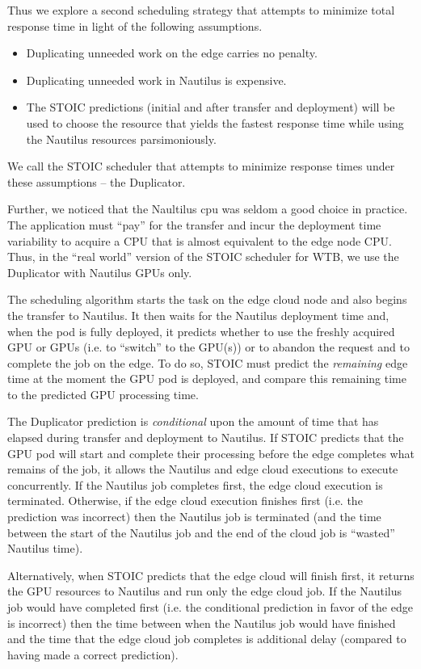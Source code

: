 Thus we explore a second scheduling strategy that attempts to minimize total response time in light of the following assumptions.
\begin{itemize}
\item Duplicating unneeded work on the edge carries no penalty.
\item Duplicating unneeded work in Nautilus is expensive.
\item The STOIC predictions (initial and after transfer and deployment) will be used to
choose the resource that yields the fastest response time while using the
Nautilus resources parsimoniously.
\end{itemize}
We call the STOIC scheduler that attempts to minimize response times under these assumptions -- the Duplicator.

Further, we noticed that the Naultilus cpu was seldom a good choice in practice. The application must ``pay'' for the transfer and incur the deployment time variability to acquire a CPU that is almost equivalent to the edge node CPU.  Thus, in the ``real world'' version of the STOIC scheduler for WTB, we use the Duplicator with Nautilus GPUs only.

The scheduling algorithm starts the task on the edge cloud node and also begins the transfer to Nautilus. It then waits for the Nautilus deployment time and, when the pod is fully deployed, it predicts whether to use the freshly acquired GPU or GPUs (i.e. to ``switch'' to the GPU(s)) or to abandon the request and to complete the job on the edge.  To do so, STOIC must predict the \textit{remaining} edge time at the moment the GPU pod is deployed, and compare this remaining time to the predicted GPU processing time.  

The Duplicator prediction is \textit{conditional} upon the amount of time that has elapsed during transfer and deployment to Nautilus. If STOIC predicts that the GPU pod will start and complete their processing before the edge completes what remains of the job, it allows the Nautilus and edge cloud executions to execute concurrently. If the Nautilus job completes first, the edge cloud execution is terminated.  Otherwise, if the edge cloud execution finishes first (i.e. the prediction was incorrect) then the Nautilus job is terminated (and the time between the start of the Nautilus job and the end of the cloud job is ``wasted'' Nautilus time).

Alternatively, when STOIC predicts that the edge cloud will finish first, it returns the GPU resources to Nautilus and run only the edge cloud job. If the Nautilus job would have completed first (i.e. the conditional prediction in favor of the edge is incorrect) then the time between when the Nautilus job would have finished and the time that the edge cloud job completes is additional delay (compared to having made a correct prediction).

